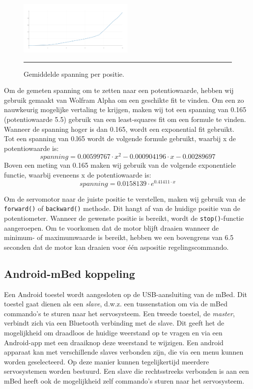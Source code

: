 \documentclass[a4paper,12pt]{article}
\begin{document}
\vspace{1em}
\begin{figure}[!htbp]
\centering
\includegraphics[width=0.5\textwidth, scale=0.5]{plot.png}
\vspace{1ex}
\hrule
\caption{Gemiddelde spanning per positie.}
\end{figure}

Om de gemeten spanning om te zetten naar een potentiowaarde, hebben wij gebruik gemaakt van Wolfram Alpha om een geschikte fit te vinden. Om een zo nauwkeurig mogelijke vertaling te krijgen, maken wij tot een spanning van 0.165 (potentiowaarde 5.5) gebruik van een least-squares fit om een formule te vinden. Wanneer de spanning hoger is dan 0.165, wordt een exponential fit gebruikt.\\
Tot een spanning van 0.l65 wordt de volgende formule gebruikt, waarbij x de potentiowaarde is:
\begin{equation}
    spanning = 0.00599767 \cdot x^2 - 0.000904196 \cdot x - 0.00289697
\end{equation}
Boven een meting van 0.165 maken wij gebruik van de volgende exponentiele functie, waarbij eveneens x de potentiowaarde is:
\begin{equation}
    spanning = 0.0158139 \cdot e^{0.41411 \cdot x}
\end{equation}

Om de servomotor naar de juiste positie te verstellen, maken wij gebruik van de \texttt{forward()} of \texttt{backward()} methode. Dit hangt af van de huidige positie van de potentiometer. Wanneer de gewenste positie is bereikt, wordt de \texttt{stop()}-functie aangeroepen. Om te voorkomen dat de motor blijft draaien wanneer de minimum- of maximumwaarde is bereikt, hebben we een bovengrens van 6.5 seconden dat de motor kan draaien voor \'{e}\'{e}n aspositie regelingscommando.

\subsection{Android-mBed koppeling}
Een Android toestel wordt aangesloten op de USB-aansluiting van de mBed. Dit toestel gaat dienen als een \textit{slave}, d.w.z. een tussenstation om via de mBed commando's te sturen naar het servosysteem. Een tweede toestel, de \textit{master}, verbindt zich via een Bluetooth verbinding met de slave. Dit geeft het de mogelijkheid om draadloos de huidige weerstand op te vragen en via een Android-app met een draaiknop deze weerstand te wijzigen. Een android apparaat kan met verschillende slaves verbonden zijn, die via een menu kunnen worden geselecteerd. Op deze manier kunnen tegelijkertijd meerdere servosystemen worden bestuurd. Een slave die rechtsstreeks verbonden is aan een mBed heeft ook de mogelijkheid zelf commando's sturen naar het servosysteem.
\end{document}
